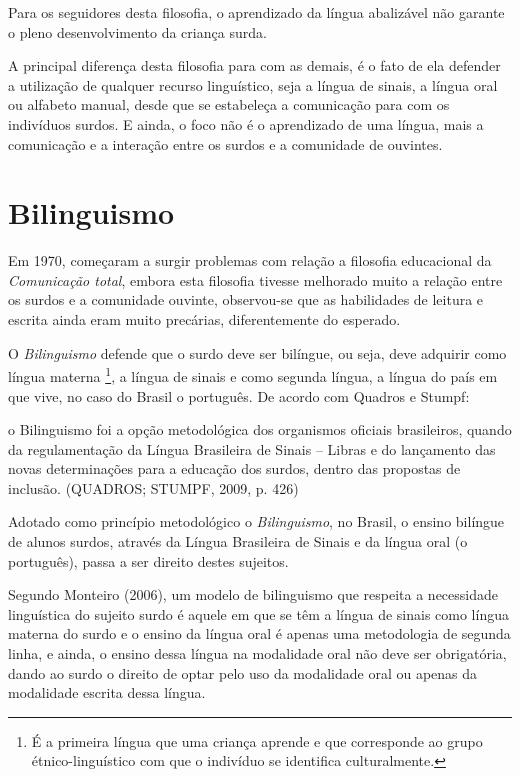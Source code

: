 \documentclass[brasil]{abnt}
\begin{document}
		 Para os seguidores desta filosofia, o aprendizado da língua abalizável não garante o pleno desenvolvimento da criança surda.
		 
		 A principal diferença desta filosofia para com as demais, é o fato de ela defender a utilização de qualquer recurso linguístico, seja a língua de sinais, a língua oral ou alfabeto manual, desde que 
		 se estabeleça a comunicação para com os indivíduos surdos. E ainda, o foco não é o aprendizado de uma língua, mais a comunicação e a interação entre os surdos e a comunidade de ouvintes.
		 
		\section{Bilinguismo}
			Em 1970, começaram a surgir problemas com relação a filosofia educacional da \textit{Comunicação total}, embora esta filosofia tivesse melhorado muito a relação entre os surdos e a comunidade 
			ouvinte, observou-se que as habilidades de leitura e escrita ainda eram muito precárias, diferentemente do esperado. 
			
			O \textit{Bilinguismo} defende que o surdo deve ser bilíngue, ou seja, deve adquirir como língua materna \footnote{É a primeira língua que uma criança aprende e que corresponde ao grupo 
			étnico-linguístico com que o indivíduo se identifica culturalmente.}, a língua de sinais e como segunda língua, a língua do país em 
			que vive, no caso do Brasil o português. De acordo com Quadros e Stumpf:
			
				\begin{citacao}o Bilinguismo foi a opção metodológica dos organismos oficiais brasileiros, quando da regulamentação da Língua Brasileira de Sinais – Libras e do lançamento das novas 
								determinações para a educação dos surdos, dentro das propostas de inclusão. (QUADROS; STUMPF, 2009, p. 426)
				\end{citacao}
			
			Adotado como princípio metodológico o \textit{Bilinguismo}, no Brasil, o ensino bilíngue de alunos surdos, através da Língua Brasileira de Sinais e da língua oral (o português), passa a ser direito 
			destes sujeitos. 
			
			Segundo Monteiro (2006), um modelo de bilinguismo que respeita a necessidade linguística do sujeito surdo é aquele em que se têm a língua de sinais como língua materna do surdo e o ensino da língua 
			oral é apenas uma metodologia de segunda linha, e ainda, o ensino dessa língua na modalidade oral não deve ser obrigatória, dando ao surdo o direito de optar pelo uso da modalidade oral ou apenas 
			da modalidade escrita dessa língua.
						
\end{document}
